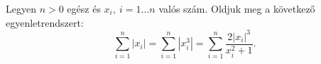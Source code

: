    Legyen $n>0$ egész és $x_{i},\ i=1\hdots n$ valós szám. Oldjuk 
   meg a következő egyenletrendszert:
   \begin{equation*}
   \sum_{i=1}^{n} |x_{i}| = \sum_{i=1}^{n} |x_{i}^{3}| = 
   \sum_{i=1}^{n} \frac{2|x_{i}|^{3}}{x_{i}^{2}+1}.
   \end{equation*}
